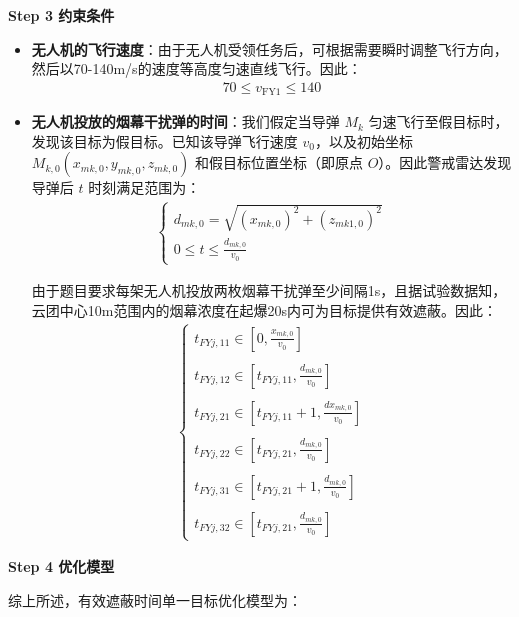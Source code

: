 \documentclass[../main.tex]{subfiles}
\begin{document}
\textbf{Step 3 约束条件}
\begin{itemize}
\item \textbf{无人机的飞行速度}：由于无人机受领任务后，可根据需要瞬时调整飞行方向，然后以70-140m/s的速度等高度匀速直线飞行。因此：
\begin{align}\label{11.8}
  70 \leq v_{\text{FY1}} \leq 140
\end{align}
\item \textbf{无人机投放的烟幕干扰弹的时间}：我们假定当导弹 \( M_k \) 匀速飞行至假目标时，发现该目标为假目标。已知该导弹飞行速度 \( v_0 \)，以及初始坐标 \( M_{k,0}(x_{mk,0}, y_{mk,0}, z_{mk,0}) \) 和假目标位置坐标（即原点 \( O \)）。因此警戒雷达发现导弹后 \( t \) 时刻满足范围为：
\begin{align}
\begin{cases}
d_{mk,0} = \sqrt{(x_{mk,0})^2 + (z_{mk1,0})^2} \\
0 \leq t \leq \frac{d_{mk,0}}{v_0}
\end{cases}
\end{align}
\par 由于题目要求每架无人机投放两枚烟幕干扰弹至少间隔1s，且据试验数据知，云团中心10m范围内的烟幕浓度在起爆20s内可为目标提供有效遮蔽。因此：
\begin{align}
\left\{ \begin{array}{l}
	t_{FYj,11}\in \left[ 0, \frac{x_{mk,0}}{v_0} \right]
	\\\\
	t_{FYj,12}\in \left[ t_{FYj,11}, \frac{d_{mk,0}}{v_0} \right]
	\\\\
	t_{FYj,21}\in \left[ t_{FYj,11}+1, \frac{dx_{mk,0}}{v_0} \right]
	\\\\
	t_{FYj,22}\in \left[ t_{FYj,21}, \frac{d_{mk,0}}{v_0} \right]
	\\\\
	t_{FYj,31}\in \left[ t_{FYj,21}+1, \frac{d_{mk,0}}{v_0} \right]
	\\\\
	t_{FYj,32}\in \left[ t_{FYj,21}, \frac{d_{mk,0}}{v_0} \right]
\end{array} \right. 
\end{align}
\end{itemize}
\textbf{Step 4 优化模型}
\par 综上所述，有效遮蔽时间单一目标优化模型为：
\end{document}
